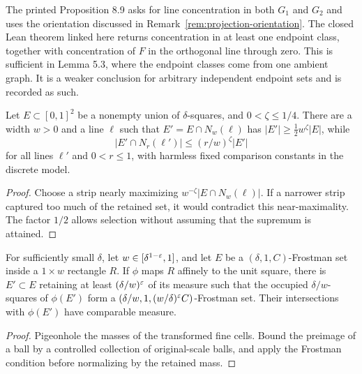 \begin{remark}
\label{rem:endpoint-union}
The printed Proposition 8.9 asks for line concentration in both
$G_1$ and $G_2$ and uses the orientation discussed in
Remark~\ref{rem:projection-orientation}. The closed Lean theorem
linked here returns concentration in at least one endpoint class,
together with concentration of $F$ in the orthogonal line through
zero. This is sufficient in Lemma 5.3, where the endpoint classes
come from one ambient graph. It is a weaker conclusion for
arbitrary independent endpoint sets and is recorded as such.
\end{remark}

\begin{lemma}
\label{lem:two-ends-strip}
Let $E\subset[0,1]^2$ be a nonempty union of $\delta$-squares,
and $0<\zeta\leq1/4$. There are a width $w>0$ and a line
$\ell$ such that $E'=E\cap N_w(\ell)$ has
$|E'|\geq\tfrac12 w^\zeta|E|$, while
\[
                    |E'\cap N_r(\ell')|
                       \leq(r/w)^\zeta|E'|
\]
for all lines $\ell'$ and $0<r\leq1$, with harmless fixed
comparison constants in the discrete model.
\end{lemma}
\begin{proof}
Choose a strip nearly maximizing $w^{-\zeta}|E\cap N_w(\ell)|$.
If a narrower strip captured too much of the retained set, it
would contradict this near-maximality. The factor $1/2$ allows
selection without assuming that the supremum is attained.
\end{proof}

\begin{lemma}
\label{lem:anisotropic-frostman}
For sufficiently small $\delta$, let
$w\in[\delta^{1-\varepsilon},1]$, and let $E$ be a
$(\delta,1,C)$-Frostman set inside a $1\times w$ rectangle $R$.
If $\phi$ maps $R$ affinely to the unit square, there is
$E'\subset E$ retaining at least $(\delta/w)^\varepsilon$ of its
measure such that the occupied $\delta/w$-squares of $\phi(E')$
form a $(\delta/w,1,(w/\delta)^\varepsilon C)$-Frostman set.
Their intersections with $\phi(E')$ have comparable measure.
\end{lemma}
\begin{proof}
Pigeonhole the masses of the transformed fine cells. Bound the
preimage of a ball by a controlled collection of original-scale
balls, and apply the Frostman condition before normalizing by
the retained mass.
\end{proof}

